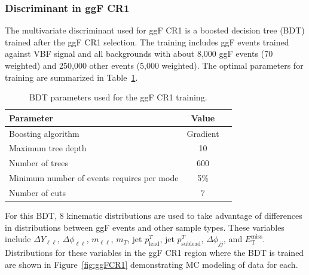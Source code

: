 \newpage

\subsubsection{Discriminant in ggF CR1}
The multivariate discriminant used for ggF CR1 is a boosted decision tree (BDT) trained after the ggF CR1 selection. The training includes ggF events trained against VBF signal and all backgrounds with about 8,000 ggF events (70 weighted) and 250,000 other events (5,000 weighted). The optimal parameters for training are summarized in Table~\ref{tab:ggFCR1BDTparameters}.
\begin{table}[h!]
\centering
\begin{tabular}{|l|c|c|}
\hline
Parameter                                    & Value     \\
\hline
Boosting algorithm                           & Gradient \\
Maximum tree depth                           &  10      \\
Number of trees                              &  600    \\
Minimum number of events requires per mode   &  5\%     \\ 
Number of cuts                               &  7       \\
\hline
\end{tabular}
\caption{BDT parameters used for the ggF CR1 training.}
\label{tab:ggFCR1BDTparameters}
\end{table}
 
For this BDT, 8 kinematic distributions are used to take advantage of differences in distributions between ggF events and other sample types. These variables include $\Delta Y_{\ell\ell}$, $\Delta \phi_{\ell\ell}$, $m_{\ell\ell}$, $m_T$, jet $p^T_{\text{lead}}$, jet $p^T_{\text{sublead}}$, $\Delta \phi_{jj}$, and $\ensuremath{E_{\text{T}}^{\text{miss}}}$. Distributions for these variables in the ggF CR1 region where the BDT is trained are shown in Figure~\ref{fig:ggFCR1} demonstrating MC modeling of data for each.

